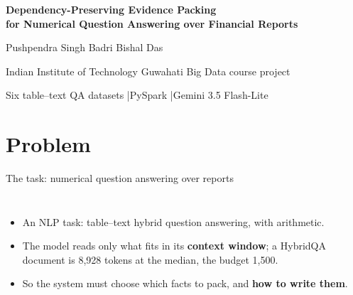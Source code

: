 \documentclass[aspectratio=169,11pt]{beamer}
\newcommand{\pos}[1]{\textcolor{deporange}{\textbf{#1}}}
\begin{document}
\begin{frame}[plain]
\vfill
{\Large\bfseries Dependency-Preserving Evidence Packing\\for Numerical Question Answering over Financial Reports\par}
\vspace{1.2em}
{\large Pushpendra Singh \quad Badri Bishal Das\par}
\vspace{.3em}
{\color{muted}Indian Institute of Technology Guwahati \textbullet{} Big Data course project\par}
\vfill
{\footnotesize\color{muted}Six table--text QA datasets \quad|\quad PySpark \quad|\quad Gemini 3.5 Flash-Lite\par}
\end{frame}

\section{Problem}
\begin{frame}{The task: numerical question answering over reports}
\begin{columns}[c]
\begin{itemize}\itemsep6pt
\item An NLP task: table--text hybrid question answering, with arithmetic.
\item The model reads only what fits in its \pos{context window}; a HybridQA document is 8,928 tokens at the median, the budget 1,500.
\item So the system must choose which facts to pack, and \pos{how to write them}.
\end{itemize}
\end{columns}
\end{frame}
\end{document}
